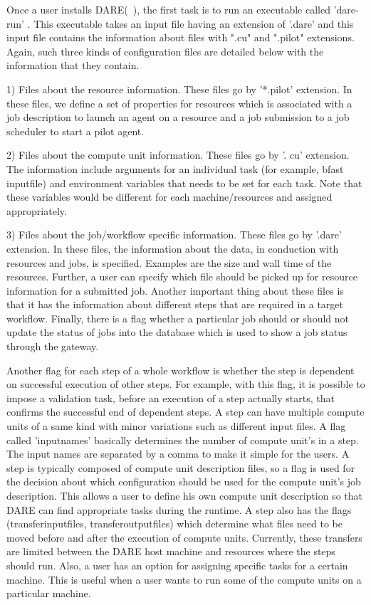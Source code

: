 \documentclass[]{svjour3}
\begin{document}
Once a user installs DARE(~\cite{dare_api_web}), the first task is to run an executable called 'dare-run' . 
This executable takes an input file having an extension of '.dare' and this input file contains the information about files with ".cu" and ".pilot" extensions.  Again, such three kinds of configuration files are detailed below with the information that they contain.

1) Files about the resource information. These files go by '*.pilot' extension. In these files, we define a set of properties for resources which is associated with a job description to launch an agent on a resource and a job submission to a job scheduler to start a pilot agent. 

2) Files about the compute unit information.  These files go by '. cu'  extension.  The information include arguments for an individual task (for example, bfast input\textunderscore file) and environment variables that needs to be set for each task. Note that these variables would be different for each machine/resources and assigned appropriately.

3) Files about the job/workflow specific information.  These files go by '.dare' extension. In these files, the information about the data, in conduction with resources and jobs, is specified. Examples are the size and wall time of the resources.  Further, a user can specify which file should be picked up for resource information for a submitted job.  Another important thing about these files is that it has the information about different steps that are required in a target workflow.  Finally, there is a flag whether a particular job should or should not update the status of jobs into the database which is used to show a job status through the gateway.  

Another flag for each step of a whole workflow is whether the step is dependent on successful execution of other steps.  For example, with this flag, it is possible to impose a validation task, before an execution of a step actually starts, that confirms the successful end of dependent steps.  A step can have multiple compute units of a same kind with minor variations such as different input files.  A flag called 'input\textunderscore names' basically determines the number of compute unit's in a step. The input names are separated by a comma to make it simple for the users. A step is typically composed of compute unit description files, so a flag is used for the decision about which configuration should be used for the compute unit's job description.  This allows a user to define his own compute unit description so that DARE can find appropriate tasks during the runtime. A step also has the flags (transfer\textunderscore input\textunderscore files, transfer\textunderscore output\textunderscore files) which determine what files need to be moved before and after the execution of compute units. Currently, these transfers are limited between the DARE host machine and resources where the steps should run.  Also, a user has an option for assigning specific tasks for a certain machine.  This is useful when a user wants to run some of the compute units on a particular machine. 
\end{document}
